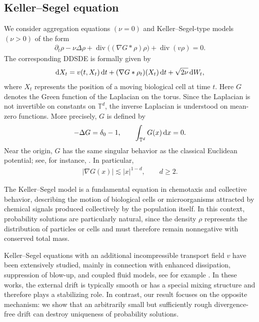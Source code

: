 \documentclass[UTF-8,reqno]{amsart}
\numberwithin{equation}{section}
\theoremstyle{definition}
\def\dif{{\mathord{{\rm d}}}}
\def\geq{\geqslant}
\def\dif{{\mathord{{\rm d}}}}
\def\geq{\geqslant}
\begin{document}
 \subsection{Keller--Segel equation}\label{sec:example:kse}

We consider aggregation equations $(\nu=0)$ and Keller--Segel-type models
$(\nu>0)$ of the form
\begin{align*}
\partial_t\rho
-
\nu\Delta\rho
+
\operatorname{div}\bigl((\nabla G*\rho)\rho\bigr)
+
\operatorname{div}(v\rho)
=
0 .
\end{align*}
The corresponding DDSDE is formally given by
\begin{align}
\dif X_t
=
v(t,X_t)\,\dif t
+
(\nabla G*\rho_t)(X_t)\,\dif t
+
\sqrt{2\nu}\,\dif W_t,
\notag
\end{align}
where $X_t$ represents the position of a moving biological cell at time $t$.
Here $G$ denotes the Green function of the Laplacian on the torus. Since the
Laplacian is not invertible on constants on $\mathbb{T}^d$, the inverse
Laplacian is understood on mean-zero functions. More precisely, $G$ is defined
by
\begin{align*}
-\Delta G=\delta_0-1,
\qquad
\int_{\mathbb{T}^d}G(x)\,\dif x=0 .
\end{align*}
Near the origin, $G$ has the same singular behavior as the classical Euclidean
potential; see, for instance, \cite{Jos19}. In particular,
\begin{align*}
|\nabla G(x)|
\lesssim
|x|^{1-d},
\qquad
d\geq 2 .
\end{align*} 

The Keller--Segel model \cite{KS70,KS71} is a fundamental equation in
chemotaxis and collective behavior, describing the motion of biological cells
or microorganisms attracted by chemical signals produced collectively by the
population itself. In this context, probability solutions are particularly
natural, since the density $\rho$ represents the distribution of particles or
cells and must therefore remain nonnegative with conserved total mass.

Keller--Segel equations with an additional incompressible transport field $v$ have
been extensively studied, mainly in connection with enhanced dissipation,
suppression of blow-up, and coupled fluid models, see for example \cite{BH17,IXZ21,HKY25}. In these works, the external
drift is typically smooth or has a special mixing structure and therefore plays
a stabilizing role. In contrast, our result focuses on the opposite mechanism:
we show that an arbitrarily small but sufficiently rough divergence-free drift
can destroy uniqueness of probability solutions.  
\end{document}
